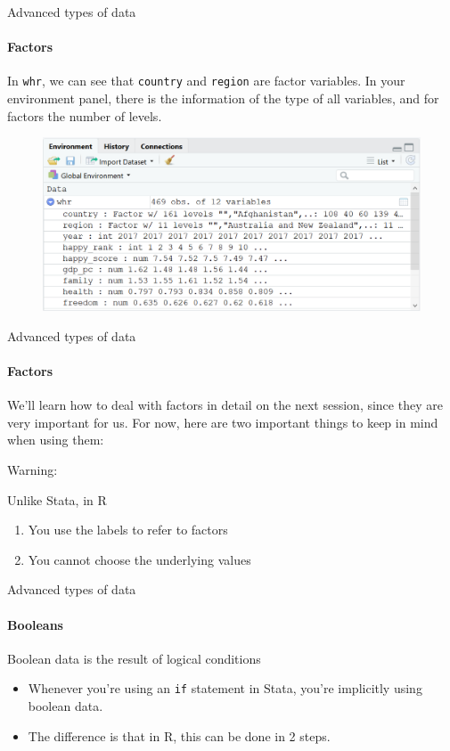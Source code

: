 \documentclass[ignorenonframetext,]{beamer}
\providecommand{\tightlist}{%
  \setlength{\itemsep}{0pt}\setlength{\parskip}{0pt}}
\begin{document}
\begin{frame}[fragile]{Advanced types of data}

\framesubtitle{Factors}

In \texttt{whr}, we can see that \texttt{country} and \texttt{region}
are factor variables. In your environment panel, there is the
information of the type of all variables, and for factors the number of
levels.

\begin{figure}
\centering
  \includegraphics[scale=0.46]{img/enviroment_factors.png}
\end{figure}

\end{frame}

\begin{frame}{Advanced types of data}

\framesubtitle{Factors}

We'll learn how to deal with factors in detail on the next session,
since they are very important for us. For now, here are two important
things to keep in mind when using them:

\begin{block}{Warning:}

Unlike Stata, in R

\begin{enumerate}
\def\labelenumi{\arabic{enumi}.}
\tightlist
\item
  You use the labels to refer to factors
\item
  You cannot choose the underlying values
\end{enumerate}

\end{block}

\end{frame}

\begin{frame}[fragile]{Advanced types of data}

\framesubtitle{Booleans}

Boolean data is the result of logical conditions

\begin{itemize}
\tightlist
\item
  Whenever you're using an \texttt{if} statement in Stata, you're
  implicitly using boolean data.
\item
  The difference is that in R, this can be done in 2 steps.
\end{itemize}

\end{frame}
\end{document}
